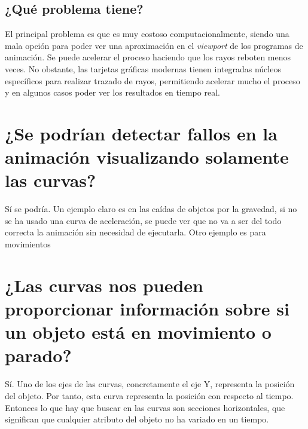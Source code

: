 \documentclass{article}
\begin{document}

\subsection{¿Qué problema tiene?}

El principal problema es que es muy costoso computacionalmente, siendo una mala opción para poder ver una aproximación en el \textit{viewport} de los programas de animación. Se puede acelerar el proceso haciendo que los rayos reboten menos veces. No obstante, las tarjetas gráficas modernas tienen integradas núcleos específicos para realizar trazado de rayos, permitiendo acelerar mucho el proceso y en algunos casos poder ver los resultados en tiempo real.



\section{¿Se podrían detectar fallos en la animación visualizando solamente las curvas?}

Sí se podría. Un ejemplo claro es en las caídas de objetos por la gravedad, si no se ha usado una curva de aceleración, se puede ver que no va a ser del todo correcta la animación sin necesidad de ejecutarla. Otro ejemplo es para movimientos

\section{¿Las curvas nos pueden proporcionar información sobre si un objeto está en movimiento o parado?}

Sí. Uno de los ejes de las curvas, concretamente el eje Y, representa la posición del objeto. Por tanto, esta curva representa la posición con respecto al tiempo. Entonces lo que hay que buscar en las curvas son secciones horizontales, que significan que cualquier atributo del objeto no ha variado en un tiempo.
\end{document}
